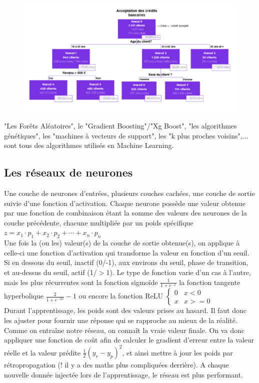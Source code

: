 \documentclass[a4paper, 12pt]{article}
\numberwithin{equation}{subsection}
\begin{document}
\begin{figure}[H]
  \centering
  \includegraphics[scale=1]{imgs/algo_ml.png}
\end{figure}

"Les Forêts Aléatoires", le "Gradient Boosting"/"Xg Boost", "les algorithmes génétiques", les "machines à vecteurs de support", les "k plus proches voisins",... sont tous des algorithmes utilisés en Machine Learning.

\subsection{Les réseaux de neurones}
Une couche de neurones d’entrées, plusieurs couches cachées, une couche de sortie suivie d’une fonction d’activation.
Chaque neurone possède une valeur obtenue par une fonction de combinaison étant la somme des valeurs des neurones de la couche précédente, chacune multipliée par un poids spécifique
$ z = x_1 \cdot p_1 + x_2 \cdot p_2 + \cdots + x_n \cdot p_n $ \\

Une fois la (ou les) valeur(s) de la couche de sortie obtenue(s), on applique à celle-ci une fonction d’activation qui transforme la valeur en fonction d’un seuil. Si en dessous du seuil, inactif (0/-1), aux environs du seuil, phase de transition, et au-dessus du seuil, actif (1/$>$1). Le type de fonction varie d’un cas à l’autre, mais les plus récurrentes sont la fonction sigmoïde $ \frac{1}{1 + e^{-x}} $ la fonction tangente hyperbolique $ \frac{2} {1 + e^{-2x}} -1 $
ou encore la fonction ReLU $ \begin{cases} 0 & x < 0 \\ x & x >= 0 \end{cases} $ \\

Durant l’apprentissage, les poids sont des valeurs prises au hasard. Il faut donc les ajuster pour fournir une réponse qui se rapproche au mieux de la réalité. Comme on entraîne notre réseau, on connaît la vraie valeur finale. On va donc appliquer une fonction de coût afin de calculer le gradient d’erreur entre la valeur réelle et la valeur prédite $ \frac{1}{2}(y_r - y_p)^2 $, et ainsi mettre à jour les poids par rétropropagation (! il y a des maths plus compliquées derrière). A chaque nouvelle donnée injectée lors de l’apprentissage, le réseau est plus performant.
\end{document}
